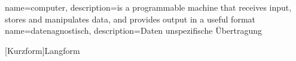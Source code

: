 {
  name=computer,
  description={is a programmable machine that receives input,
               stores and manipulates data, and provides
               output in a useful format}
}
{
	name=datenagnostisch,
	description={Daten unspezifische Übertragung}
}

\begin{acronym}
	[Kurzform]{Langform}
\end{acronym}
